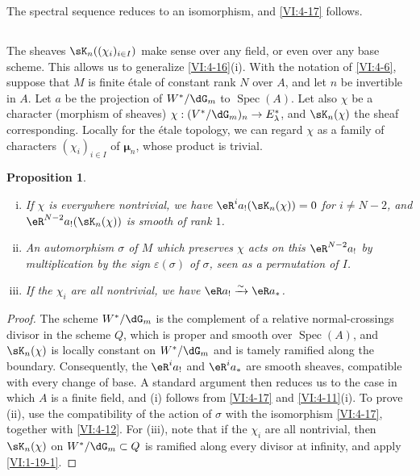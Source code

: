 \documentclass[oneside]{book}
\DeclareMathOperator{\spec}{Spec}
\newcommand{\dmu}{{\bm\mu}}
\newcounter{char}
\newcommand{\iso}{\xrightarrow\sim}
\theoremstyle{sga-source}
\theoremstyle{sga-source-dash}
\theoremstyle{sga-source-dotdash}
\theoremstyle{sga-source-number-note-dash}
\theoremstyle{sga-source-note-number-dotdash}
\theoremstyle{sga-source-example-dotdash}
\theoremstyle{sga-source-inline-number}
\theoremstyle{sga-source-bare-number}
\theoremstyle{sga-source}
\newtheorem{proposition_}[subsection]{Proposition}
\newcommand{\PrintPage}[1]{}\newcommand{\MathPage}[1]{}\newcommand{\PrintCite}[2]{#1}\newcommand{\var}[3]{#2}
\begin{document}
The spectral sequence reduces to an isomorphism, and \ref{VI:4-17} follows. 





\subsection{}\label{VI:4-19}

The sheaves $\sK_n((\chi_i)_{i\in I})$ make sense over any field, 
or even over any base scheme. This allows us to generalize 
\ref{VI:4-16}(i). With the notation of \ref{VI:4-6}, suppose that $M$ is finite 
étale of constant rank $N$ over $A$, and let $n$ be invertible in $A$. 
Let $a$ be the projection of $W^\ast/\dG_m$ to $\spec(A)$. Let also $\chi$ be 
a character (morphism of sheaves) 
$\chi:(V^\ast/\dG_m)_n \to E_\lambda^\ast$, and $\sK_n(\chi)$ the sheaf 
corresponding. Locally for the étale topology, we can regard $\chi$ 
as a family of characters $(\chi_i)_{i\in I}$ of $\dmu_n$, whose product is 
trivial.

\begin{proposition_}\label{VI:4-20}
\begin{enumerate}[(i)]
  \item If $\chi$ is everywhere nontrivial, we have 
    $\eR^i a_! (\sK_n(\chi)) = 0$ for $i\ne \var{N-1}{N-2}{S45-SOL-0856}$, and 
    $\eR^{\var{N-1}{N-2}{S45-SOL-0856}} a_!(\sK_n(\chi))$ is smooth of rank $1$. 
  \item An automorphism $\sigma$ of $M$ which preserves $\chi$ acts on this 
    $\eR^{\var{N-1}{N-2}{S45-SOL-0856}} a_!$ by multiplication by the sign $\varepsilon(\sigma)$ 
    of $\sigma$, seen as a permutation of $I$. 
  \item If the $\chi_i$ are all nontrivial, we have $\eR a_! \iso \eR a_\ast$. 
\end{enumerate}
\end{proposition_}
\begin{proof}[Proof]
The scheme $W^\ast/\dG_m$ is the complement of a relative normal-crossings 
divisor in the scheme $Q$, which is proper and smooth over $\spec(A)$, and 
$\sK_n(\chi)$ is \PrintPage{207}
locally constant on $W^\ast/\dG_m$ and is tamely ramified 
along the boundary. Consequently, the $\eR^i a_!$ and 
$\eR^i a_\ast$ are smooth sheaves, compatible with every change of 
base. A standard argument then reduces us to the case in which $A$ is a 
finite field, and (i) follows from \ref{VI:4-17} and \ref{VI:4-11}(i). 
To prove (ii), use the compatibility of the action of $\sigma$ with 
the isomorphism \ref{VI:4-17}, together with \ref{VI:4-12}. For (iii), note that if the 
$\chi_i$ are all nontrivial, then $\sK_n(\chi)$ on 
$W^\ast/\dG_m\subset Q$ is ramified along every divisor at infinity, 
and apply \ref{VI:1-19-1}. 
\end{proof}
\end{document}
